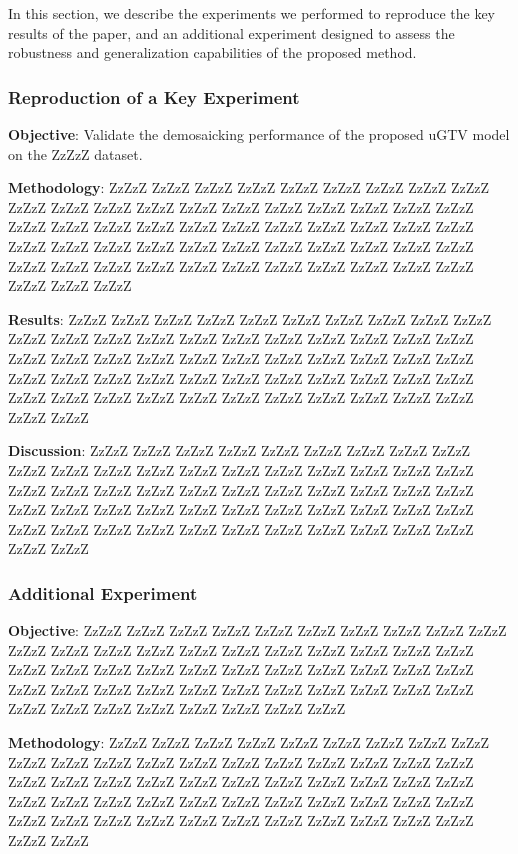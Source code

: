 \documentclass{article}
\theoremstyle{plain}
\theoremstyle{definition}
\theoremstyle{remark}
\begin{document}
In this section, we describe the experiments we performed to reproduce the key results of the paper, and an additional experiment designed to assess the robustness and generalization capabilities of the proposed method.

\subsubsection{Reproduction of a Key Experiment}


\textbf{Objective}: Validate the demosaicking performance of the proposed uGTV model on the ZzZzZ dataset.

\textbf{Methodology}: ZzZzZ ZzZzZ ZzZzZ ZzZzZ ZzZzZ ZzZzZ ZzZzZ ZzZzZ ZzZzZ ZzZzZ ZzZzZ ZzZzZ ZzZzZ ZzZzZ ZzZzZ ZzZzZ ZzZzZ ZzZzZ ZzZzZ ZzZzZ ZzZzZ ZzZzZ ZzZzZ ZzZzZ ZzZzZ ZzZzZ ZzZzZ ZzZzZ ZzZzZ ZzZzZ ZzZzZ ZzZzZ ZzZzZ ZzZzZ ZzZzZ ZzZzZ ZzZzZ ZzZzZ ZzZzZ ZzZzZ ZzZzZ ZzZzZ ZzZzZ ZzZzZ ZzZzZ ZzZzZ ZzZzZ ZzZzZ ZzZzZ ZzZzZ ZzZzZ ZzZzZ ZzZzZ ZzZzZ ZzZzZ ZzZzZ

\textbf{Results}: ZzZzZ ZzZzZ ZzZzZ ZzZzZ ZzZzZ ZzZzZ ZzZzZ ZzZzZ ZzZzZ ZzZzZ ZzZzZ ZzZzZ ZzZzZ ZzZzZ ZzZzZ ZzZzZ ZzZzZ ZzZzZ ZzZzZ ZzZzZ ZzZzZ ZzZzZ ZzZzZ ZzZzZ ZzZzZ ZzZzZ ZzZzZ ZzZzZ ZzZzZ ZzZzZ ZzZzZ ZzZzZ ZzZzZ ZzZzZ ZzZzZ ZzZzZ ZzZzZ ZzZzZ ZzZzZ ZzZzZ ZzZzZ ZzZzZ ZzZzZ ZzZzZ ZzZzZ ZzZzZ ZzZzZ ZzZzZ ZzZzZ ZzZzZ ZzZzZ ZzZzZ ZzZzZ ZzZzZ ZzZzZ ZzZzZ

\textbf{Discussion}: ZzZzZ ZzZzZ ZzZzZ ZzZzZ ZzZzZ ZzZzZ ZzZzZ ZzZzZ ZzZzZ ZzZzZ ZzZzZ ZzZzZ ZzZzZ ZzZzZ ZzZzZ ZzZzZ ZzZzZ ZzZzZ ZzZzZ ZzZzZ ZzZzZ ZzZzZ ZzZzZ ZzZzZ ZzZzZ ZzZzZ ZzZzZ ZzZzZ ZzZzZ ZzZzZ ZzZzZ ZzZzZ ZzZzZ ZzZzZ ZzZzZ ZzZzZ ZzZzZ ZzZzZ ZzZzZ ZzZzZ ZzZzZ ZzZzZ ZzZzZ ZzZzZ ZzZzZ ZzZzZ ZzZzZ ZzZzZ ZzZzZ ZzZzZ ZzZzZ ZzZzZ ZzZzZ ZzZzZ ZzZzZ

\subsubsection{Additional Experiment}

\textbf{Objective}: ZzZzZ ZzZzZ ZzZzZ ZzZzZ ZzZzZ ZzZzZ ZzZzZ ZzZzZ ZzZzZ ZzZzZ ZzZzZ ZzZzZ ZzZzZ ZzZzZ ZzZzZ ZzZzZ ZzZzZ ZzZzZ ZzZzZ ZzZzZ ZzZzZ ZzZzZ ZzZzZ ZzZzZ ZzZzZ ZzZzZ ZzZzZ ZzZzZ ZzZzZ ZzZzZ ZzZzZ ZzZzZ ZzZzZ ZzZzZ ZzZzZ ZzZzZ ZzZzZ ZzZzZ ZzZzZ ZzZzZ ZzZzZ ZzZzZ ZzZzZ ZzZzZ ZzZzZ ZzZzZ ZzZzZ ZzZzZ ZzZzZ ZzZzZ ZzZzZ 

\textbf{Methodology}: ZzZzZ ZzZzZ ZzZzZ ZzZzZ ZzZzZ ZzZzZ ZzZzZ ZzZzZ ZzZzZ ZzZzZ ZzZzZ ZzZzZ ZzZzZ ZzZzZ ZzZzZ ZzZzZ ZzZzZ ZzZzZ ZzZzZ ZzZzZ ZzZzZ ZzZzZ ZzZzZ ZzZzZ ZzZzZ ZzZzZ ZzZzZ ZzZzZ ZzZzZ ZzZzZ ZzZzZ ZzZzZ ZzZzZ ZzZzZ ZzZzZ ZzZzZ ZzZzZ ZzZzZ ZzZzZ ZzZzZ ZzZzZ ZzZzZ ZzZzZ ZzZzZ ZzZzZ ZzZzZ ZzZzZ ZzZzZ ZzZzZ ZzZzZ ZzZzZ ZzZzZ ZzZzZ ZzZzZ ZzZzZ
\end{document}
